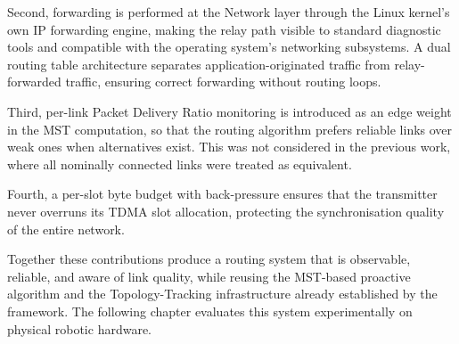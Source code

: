 Second, forwarding is performed at the Network layer through the Linux kernel's own IP
forwarding engine, making the relay path visible to standard diagnostic tools and
compatible with the operating system's networking subsystems. A dual routing table
architecture separates application-originated traffic from relay-forwarded traffic, ensuring
correct forwarding without routing loops.

Third, per-link Packet Delivery Ratio monitoring is introduced as an edge weight in the
MST computation, so that the routing algorithm prefers reliable links over weak ones when
alternatives exist. This was not considered in the previous work, where all nominally
connected links were treated as equivalent.

Fourth, a per-slot byte budget with back-pressure ensures that the transmitter never
overruns its TDMA slot allocation, protecting the synchronisation quality of the entire
network.

Together these contributions produce a routing system that is observable, reliable, and
aware of link quality, while reusing the MST-based proactive algorithm and the
Topology-Tracking infrastructure already established by the framework. The following
chapter evaluates this system experimentally on physical robotic hardware.
